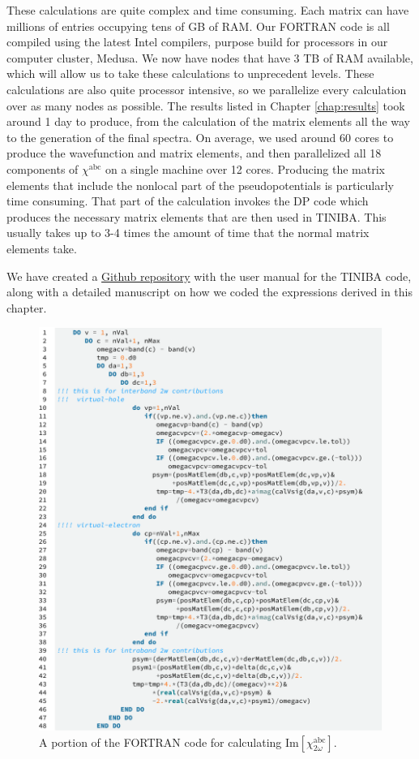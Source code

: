 These calculations are quite complex and time consuming. Each matrix can have
millions of entries occupying tens of GB of RAM. Our FORTRAN code is all
compiled using the latest Intel compilers, purpose build for processors in our
computer cluster, Medusa. We now have nodes that have 3 TB of RAM available,
which will allow us to take these calculations to unprecedent levels. These
calculations are also quite processor intensive, so we parallelize every
calculation over as many nodes as possible. The results listed in Chapter
\ref{chap:results} took around 1 day to produce, from the calculation of the
matrix elements all the way to the generation of the final spectra. On average,
we used around 60 cores to produce the wavefunction and matrix elements, and
then parallelized all 18 components of $\chi^{\mathrm{abc}}$ on a single machine
over 12 cores. Producing the matrix elements that include the nonlocal part of
the pseudopotentials is particularly time consuming. That part of the
calculation invokes the DP code \cite{olevanoDP} which produces the necessary
matrix elements that are then used in TINIBA. This usually takes up to 3-4 times
the amount of time that the normal matrix elements take.

We have created a
\href{https://github.com/roguephysicist/tiniba-manual}{Github repository} with
the user manual for the TINIBA code, along with a detailed manuscript on how we
coded the expressions derived in this chapter. 

\begin{figure}[b]
\centering
\includegraphics[width=\textwidth]{content/figures/code-tiniba}
\caption[A portion of the FORTRAN code.]
{A portion of the FORTRAN code for calculating
$\mathrm{Im}[\chi^{\mathrm{a}\mathrm{b}\mathrm{c}}_{2\omega}]$.}
\label{fig:tiniba}
\end{figure}


